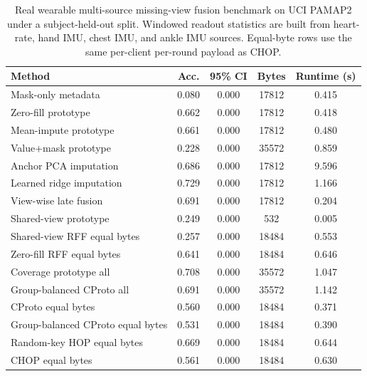 \begin{table}[t]
\centering
\caption{Real wearable multi-source missing-view fusion benchmark on UCI PAMAP2 under a subject-held-out split. Windowed readout statistics are built from heart-rate, hand IMU, chest IMU, and ankle IMU sources. Equal-byte rows use the same per-client per-round payload as CHOP.}
\label{tab:if-pamap2-fusion}
\scriptsize
\setlength{\tabcolsep}{3pt}
\renewcommand{\arraystretch}{0.94}
\begin{tabular}{lcccc}
\toprule
Method & Acc. & 95\% CI & Bytes & Runtime (s) \\
\midrule
Mask-only metadata & 0.080 & 0.000 & 17812 & 0.415 \\
Zero-fill prototype & 0.662 & 0.000 & 17812 & 0.418 \\
Mean-impute prototype & 0.661 & 0.000 & 17812 & 0.480 \\
Value+mask prototype & 0.228 & 0.000 & 35572 & 0.859 \\
Anchor PCA imputation & 0.686 & 0.000 & 17812 & 9.596 \\
Learned ridge imputation & 0.729 & 0.000 & 17812 & 1.166 \\
View-wise late fusion & 0.691 & 0.000 & 17812 & 0.204 \\
Shared-view prototype & 0.249 & 0.000 & 532 & 0.005 \\
Shared-view RFF equal bytes & 0.257 & 0.000 & 18484 & 0.553 \\
Zero-fill RFF equal bytes & 0.641 & 0.000 & 18484 & 0.646 \\
Coverage prototype all & 0.708 & 0.000 & 35572 & 1.047 \\
Group-balanced CProto all & 0.691 & 0.000 & 35572 & 1.142 \\
CProto equal bytes & 0.560 & 0.000 & 18484 & 0.371 \\
Group-balanced CProto equal bytes & 0.531 & 0.000 & 18484 & 0.390 \\
Random-key HOP equal bytes & 0.669 & 0.000 & 18484 & 0.644 \\
CHOP equal bytes & 0.561 & 0.000 & 18484 & 0.630 \\
\bottomrule
\end{tabular}
\end{table}

